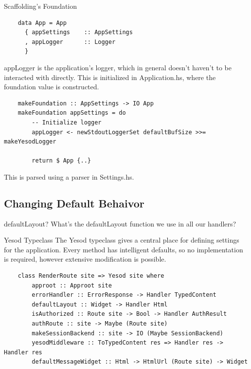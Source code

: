 \documentclass[pdf]{beamer}
\begin{document}
\begin{frame}[fragile]{Scaffolding's Foundation}
  \begin{verbatim}
    data App = App
      { appSettings    :: AppSettings
      , appLogger      :: Logger
      }
  \end{verbatim}

  appLogger is the application's logger, which in general doesn't
  haven't to be interacted with directly. This is initialized in
  Application.hs, where the foundation value is constructed.

  \begin{verbatim}
    makeFoundation :: AppSettings -> IO App
    makeFoundation appSettings = do
        -- Initialize logger
        appLogger <- newStdoutLoggerSet defaultBufSize >>= makeYesodLogger

        return $ App {..}
  \end{verbatim}

  This is parsed using a parser in Settings.hs.
\end{frame}

\subsection{Changing Default Behaivor}
\begin{frame}{defaultLayout?}
  What's the defaultLayout function we use in all our handlers?
\end{frame}

\begin{frame}[fragile]{Yesod Typeclass}
  The Yesod typeclass gives a central place for defining settings for
  the application. Every method has intelligent defaults, so no
  implementation is required, however extensive modification is
  possible.

  \begin{verbatim}
    class RenderRoute site => Yesod site where
        approot :: Approot site
        errorHandler :: ErrorResponse -> Handler TypedContent
        defaultLayout :: Widget -> Handler Html
        isAuthorized :: Route site -> Bool -> Handler AuthResult
        authRoute :: site -> Maybe (Route site)
        makeSessionBackend :: site -> IO (Maybe SessionBackend)
        yesodMiddleware :: ToTypedContent res => Handler res -> Handler res
        defaultMessageWidget :: Html -> HtmlUrl (Route site) -> Widget
  \end{verbatim}
\end{frame}
\end{document}
